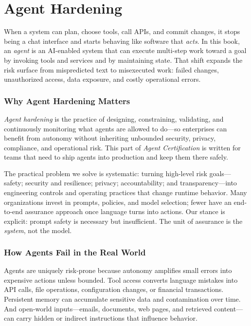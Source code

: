 \part{Agent Hardening }


\begin{TNtwocol}


  When a system can plan, choose tools, call APIs, and commit changes, it stops being a chat interface and starts behaving like software that \emph{acts}. In this book, an \emph{agent} is an AI-enabled system that can execute multi-step work toward a goal by invoking tools and services and by maintaining state. That shift expands the risk surface from mispredicted text to misexecuted work: failed changes, unauthorized access, data exposure, and costly operational errors.

  \section*{Why Agent Hardening Matters}
  \emph{Agent hardening} is the practice of designing, constraining, validating, and continuously monitoring what agents are allowed to do---so enterprises can benefit from autonomy without inheriting unbounded security, privacy, compliance, and operational risk. This part of \emph{Agent Certification} is written for teams that need to ship agents into production and keep them there safely.

  The practical problem we solve is systematic: turning high-level risk goals---safety; security and resilience; privacy; accountability; and transparency---into engineering controls and operating practices that change runtime behavior. Many organizations invest in prompts, policies, and model selection; fewer have an end-to-end assurance approach once language turns into actions. Our stance is explicit: prompt safety is necessary but insufficient. The unit of assurance is the \emph{system}, not the model.

  \section*{How Agents Fail in the Real World}
  Agents are uniquely risk-prone because autonomy amplifies small errors into expensive actions unless bounded. Tool access converts language mistakes into API calls, file operations, configuration changes, or financial transactions. Persistent memory can accumulate sensitive data and contamination over time. And open-world inputs---emails, documents, web pages, and retrieved content---can carry hidden or indirect instructions that influence behavior.


\end{TNtwocol}
